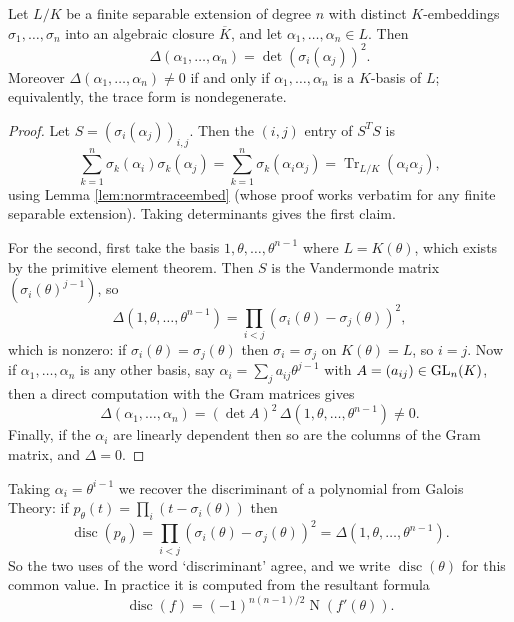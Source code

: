 \documentclass[a4paper]{scrartcl}
\newcommand{\disc}{\operatorname{disc}}
\newcommand{\Nm}{\operatorname{N}}
\newcommand{\Tr}{\operatorname{Tr}}
\begin{document}
\begin{proposition}\label{prop:traceform}
	Let $L/K$ be a finite separable extension of degree $n$ with distinct $K$-embeddings $\sigma_1, \dots, \sigma_n$ into an algebraic closure $\overline K$, and let $\alpha_1, \dots, \alpha_n \in L$. Then
	$$\Delta(\alpha_1, \dots, \alpha_n) = \det\left(\sigma_i(\alpha_j)\right)^2.$$
	Moreover $\Delta(\alpha_1,\dots,\alpha_n) \neq 0$ if and only if $\alpha_1, \dots, \alpha_n$ is a $K$-basis of $L$; equivalently, the trace form is nondegenerate.
\end{proposition}

\begin{proof}
	Let $S = (\sigma_i(\alpha_j))_{i,j}$. Then the $(i,j)$ entry of $S^TS$ is
	$$\sum_{k=1}^n \sigma_k(\alpha_i)\sigma_k(\alpha_j) = \sum_{k=1}^n\sigma_k(\alpha_i\alpha_j) = \Tr_{L/K}(\alpha_i\alpha_j),$$
	using Lemma \ref{lem:normtraceembed} (whose proof works verbatim for any finite separable extension). Taking determinants gives the first claim.

	For the second, first take the basis $1, \theta, \dots, \theta^{n-1}$ where $L = K(\theta)$, which exists by the primitive element theorem. Then $S$ is the Vandermonde matrix $(\sigma_i(\theta)^{j-1})$, so
	$$\Delta(1,\theta,\dots,\theta^{n-1}) = \prod_{i < j}\left(\sigma_i(\theta) - \sigma_j(\theta)\right)^2,$$
	which is nonzero: if $\sigma_i(\theta) = \sigma_j(\theta)$ then $\sigma_i = \sigma_j$ on $K(\theta) = L$, so $i = j$. Now if $\alpha_1, \dots, \alpha_n$ is any other basis, say $\alpha_i = \sum_j a_{ij}\theta^{j-1}$ with $A = (a_{ij}) \in \operatorname{GL}_n(K)$, then a direct computation with the Gram matrices gives
	$$\Delta(\alpha_1,\dots,\alpha_n) = (\det A)^2\,\Delta(1,\theta,\dots,\theta^{n-1}) \neq 0.$$
	Finally, if the $\alpha_i$ are linearly dependent then so are the columns of the Gram matrix, and $\Delta = 0$.
\end{proof}

\begin{remark}
	Taking $\alpha_i = \theta^{i-1}$ we recover the discriminant of a polynomial from Galois Theory: if $p_\theta(t) = \prod_i(t - \sigma_i(\theta))$ then
	$$\disc(p_\theta) = \prod_{i<j}(\sigma_i(\theta) - \sigma_j(\theta))^2 = \Delta(1, \theta, \dots, \theta^{n-1}).$$
	So the two uses of the word `discriminant' agree, and we write $\disc(\theta)$ for this common value. In practice it is computed from the resultant formula
	$$\disc(f) = (-1)^{n(n-1)/2}\Nm\left(f'(\theta)\right).$$
\end{remark}
\end{document}
